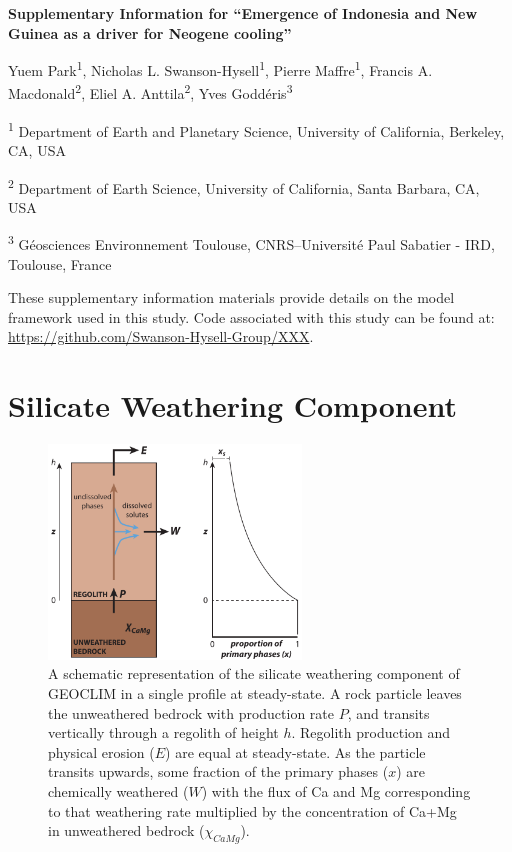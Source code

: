 \documentclass[11pt,letterpaper]{article}
\begin{document}
\begin{flushleft}
{\Large \textbf{Supplementary Information for ``Emergence of Indonesia and New Guinea as a driver for Neogene cooling''}}

Yuem Park\textsuperscript{1},
Nicholas L. Swanson-Hysell\textsuperscript{1},
Pierre Maffre\textsuperscript{1},
Francis A. Macdonald\textsuperscript{2},
Eliel A. Anttila\textsuperscript{2},
Yves Godd\'eris\textsuperscript{3}

\bigskip
\textsuperscript{1} Department of Earth and Planetary Science, University of California, Berkeley, CA, USA

\textsuperscript{2} Department of Earth Science, University of California, Santa Barbara, CA, USA

\textsuperscript{3} G\'eosciences Environnement Toulouse, CNRS--Universit\'e Paul Sabatier - IRD, Toulouse, France

\bigskip

\end{flushleft}

\linenumbers

These supplementary information materials provide details on the model framework used in this study. Code associated with this study can be found at: \url{https://github.com/Swanson-Hysell-Group/XXX}.

\section*{Silicate Weathering Component}

\begin{figure}
\begin{center}
	\includegraphics[width=0.6\textwidth]{../Figures/regolith_schematic.pdf}
	\caption{A schematic representation of the silicate weathering component of GEOCLIM in a single profile at steady-state. A rock particle leaves the unweathered bedrock with production rate $P$, and transits vertically through a regolith of height $h$. Regolith production and physical erosion ($E$) are equal at steady-state. As the particle transits upwards, some fraction of the primary phases ($x$) are chemically weathered ($W$) with the flux of Ca and Mg corresponding to that weathering rate multiplied by the concentration of Ca+Mg in unweathered bedrock ($\chi_{CaMg}$).}
	\label{fig:regolith_schematic}
\end{center}
\end{figure}
\end{document}

